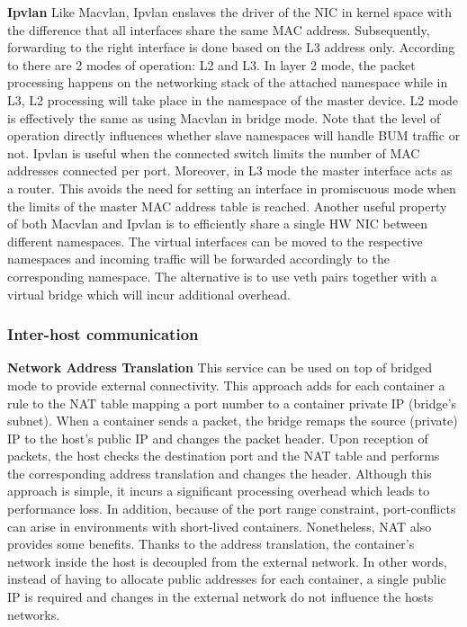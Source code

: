 \documentclass[conference]{IEEEtran}
\begin{document}
\noindent\textbf{Ipvlan}  \hspace{0.5cm}
Like Macvlan, Ipvlan enslaves the driver of the NIC in kernel space with the difference that all interfaces share the same MAC address. Subsequently, forwarding to the right interface is done based on the L3 address only. According to \cite{ipvlan} there are 2 modes of operation: L2 and L3. In layer 2 mode, the packet processing happens on the networking stack of the attached namespace while in L3, L2 processing will take place in the namespace of the master device. L2 mode is effectively the same as using Macvlan in bridge mode. Note that the level of operation directly influences whether slave namespaces will handle BUM traffic or not. 
Ipvlan is useful when the connected switch limits the number of MAC addresses connected per port. Moreover, in L3 mode the master interface acts as a router. This avoids the need for setting an interface in promiscuous mode when the limits of the master MAC address table is reached. 
Another useful property of both Macvlan and Ipvlan is to efficiently share a single HW NIC between different namespaces. The virtual interfaces can be moved to the respective namespaces and incoming traffic will be forwarded accordingly to the corresponding namespace. The alternative is to use veth pairs together with a virtual bridge which will incur additional overhead. 


\subsubsection{Inter-host communication}\hfill\break
\textbf{Network Address Translation}\hspace{0.5cm} This service can be used on top of bridged mode to provide external connectivity. This approach adds for each container a rule to the NAT table mapping a port number to a container private IP (bridge’s subnet). When a container sends a packet, the bridge remaps the source (private) IP to the host’s public IP and changes the packet header. Upon reception of packets, the host checks the destination port and the NAT table and performs the corresponding address translation and changes the header. Although this approach is simple, it incurs a significant processing overhead which leads to performance loss. In addition, because of the port range constraint, port-conflicts can arise in environments with short-lived containers. Nonetheless, NAT also provides some benefits. Thanks to the address translation, the container’s network inside the host is decoupled from the external network. In other words, instead of having to allocate public addresses for each container, a single public IP is required and changes in the external network do not influence the hosts networks.
\end{document}
